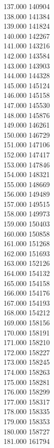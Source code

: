 { 137.000	140904 \\
 138.000	141384 \\
 139.000	141824 \\
 140.000	142267 \\
 141.000	143216 \\
 142.000	143584 \\
 143.000	143903 \\
 144.000	144328 \\
 145.000	145124 \\
 146.000	145158 \\
 147.000	145530 \\
 148.000	145876 \\
 149.000	146261 \\
 150.000	146729 \\
 151.000	147106 \\
 152.000	147417 \\
 153.000	147846 \\
 154.000	148321 \\
 155.000	148669 \\
 156.000	149489 \\
 157.000	149515 \\
 158.000	149973 \\
 159.000	150403 \\
 160.000	150858 \\
 161.000	151268 \\
 162.000	151693 \\
 163.000	152126 \\
 164.000	154132 \\
 165.000	154158 \\
 166.000	154176 \\
 167.000	154193 \\
 168.000	154212 \\
 169.000	158156 \\
 170.000	158191 \\
 171.000	158210 \\
 172.000	158227 \\
 173.000	158245 \\
 174.000	158263 \\
 175.000	158281 \\
 176.000	158299 \\
 177.000	158317 \\
 178.000	158335 \\
 179.000	158353 \\
 180.000	158727 \\
 181.000	161794 \\
}
